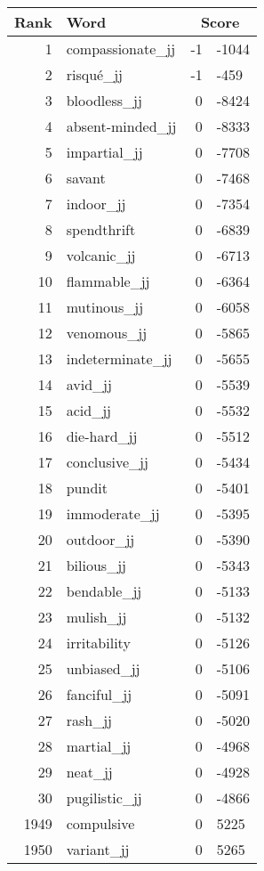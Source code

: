 \begin{longtable}[!htbp]{| rlr@{.}l |}
    \hline
    \textbf{Rank} & \textbf{Word} & \multicolumn{2}{c|}{\textbf{Score}} \\
    \hline
    \endhead
    1 & compassionate\_jj & -1 & -1044 \\
    2 & risqué\_jj & -1 & -459 \\
    3 & bloodless\_jj & 0 & -8424 \\
    4 & absent-minded\_jj & 0 & -8333 \\
    5 & impartial\_jj & 0 & -7708 \\
    6 & savant & 0 & -7468 \\
    7 & indoor\_jj & 0 & -7354 \\
    8 & spendthrift & 0 & -6839 \\
    9 & volcanic\_jj & 0 & -6713 \\
    10 & flammable\_jj & 0 & -6364 \\
    11 & mutinous\_jj & 0 & -6058 \\
    12 & venomous\_jj & 0 & -5865 \\
    13 & indeterminate\_jj & 0 & -5655 \\
    14 & avid\_jj & 0 & -5539 \\
    15 & acid\_jj & 0 & -5532 \\
    16 & die-hard\_jj & 0 & -5512 \\
    17 & conclusive\_jj & 0 & -5434 \\
    18 & pundit & 0 & -5401 \\
    19 & immoderate\_jj & 0 & -5395 \\
    20 & outdoor\_jj & 0 & -5390 \\
    21 & bilious\_jj & 0 & -5343 \\
    22 & bendable\_jj & 0 & -5133 \\
    23 & mulish\_jj & 0 & -5132 \\
    24 & irritability & 0 & -5126 \\
    25 & unbiased\_jj & 0 & -5106 \\
    26 & fanciful\_jj & 0 & -5091 \\
    27 & rash\_jj & 0 & -5020 \\
    28 & martial\_jj & 0 & -4968 \\
    29 & neat\_jj & 0 & -4928 \\
    30 & pugilistic\_jj & 0 & -4866 \\
    1949 & compulsive & 0 & 5225 \\
    1950 & variant\_jj & 0 & 5265 \\

\end{longtable}
